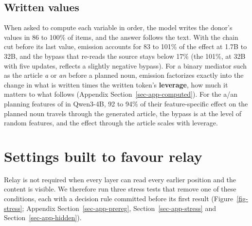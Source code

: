\documentclass[
]{article}
\begin{document}
\subsection{Written values}\label{sec-emission}

When asked to compute each variable in order, the model writes the
donor's values in 86 to 100\% of items, and the answer follows the text.
With the chain cut before its last value, emission accounts for 83 to
101\% of the effect at 1.7B to 32B, and the bypass that re-reads the
source stays below 17\% (the 101\%, at 32B with five updates, reflects a
slightly negative bypass). For a binary mediator such as the article
\emph{a} or \emph{an} before a planned noun, emission factorizes exactly
into the change in what is written times the written token's
\textbf{leverage}, how much it matters to what follows (Appendix
Section~\ref{sec-app-computed}). For the a/an planning features of
\citet{hanna2026latent} in Qwen3-4B, 92 to 94\% of their
feature-specific effect on the planned noun travels through the
generated article, the bypass is at the level of random features, and
the effect through the article scales with leverage.

\section{Settings built to favour relay}\label{sec-stress}

Relay is not required when every layer can read every earlier position
and the content is visible. We therefore run three stress tests that
remove one of these conditions, each with a decision rule committed
before its first result (Figure~\ref{fig-stress}; Appendix
Section~\ref{sec-app-prereg}, Section~\ref{sec-app-stress} and
Section~\ref{sec-app-hidden}).
\end{document}

